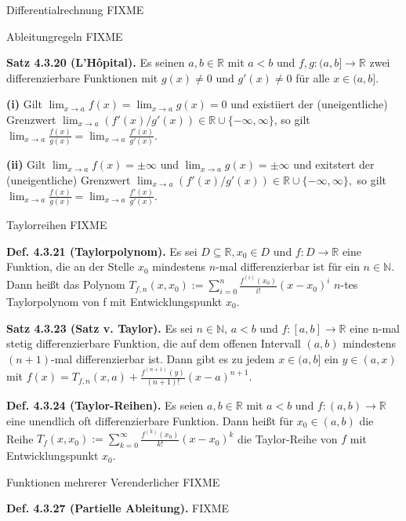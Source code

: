 Differentialrechnung FIXME



Ableitungregeln FIXME



\textbf{Satz 4.3.20 (L'Hôpital).} Es seinen $a,b\in\mathbb{R}$ mit
$a<b$ und $f,g:(a,b]\rightarrow\mathbb{R}$ zwei differenzierbare
Funktionen mit $g(x)\not=0$ und $g'(x)\not=0$ für alle $x\in(a,b]$.

\textbf{(i)} Gilt $\lim_{x\rightarrow a}f(x)=\lim_{x\rightarrow a}g(x)=0$
und existiiert der (uneigentliche) Grenzwert $\lim_{x\rightarrow a}(f'(x)/g'(x))\in\mathbb{R}\cup\{-\infty,\infty\}$,
so gilt $\lim_{x\rightarrow a}\frac{f(x)}{g(x)}=\lim_{x\rightarrow a}\frac{f'(x)}{g'(x)}$.

\textbf{(ii) }Gilt $\lim_{x\rightarrow a}f(x)=\pm\infty$ und $\lim_{x\rightarrow a}g(x)=\pm\infty$
und exitstert der (uneigentliche) Grenzwert $\lim_{x\rightarrow a}(f'(x)/g'(x))\in\mathbb{R}\cup\{-\infty,\infty\},$
so gilt $\lim_{x\rightarrow a}\frac{f(x)}{g(x)}=\lim_{x\rightarrow a}\frac{f'(x)}{g'(x)}$.

Taylorreihen FIXME

\textbf{Def. 4.3.21 (Taylorpolynom).} Es sei $D\subseteq\mathbb{R},x_{0}\in D$
und $f:D\rightarrow\mathbb{R}$ eine Funktion, die an der Stelle $x_{0}$
mindestens $n$-mal differenzierbar ist für ein $n\in\mathbb{N}.$
Dann heißt das Polynom $T_{f,n}(x,x_{0}):=\sum_{i=0}^{n}\frac{f^{(i)}(x_{0})}{i!}(x-x_{0})^{i}$
$n$-tes Taylorpolynom von f mit Entwicklungspunkt $x_{0}$.

\textbf{Satz 4.3.23 (Satz v. Taylor).} Es sei $n\in\mathbb{N}$, $a<b$
und $f:[a,b]\rightarrow\mathbb{R}$ eine n-mal stetig differenzierbare
Funktion, die auf dem offenen Intervall $(a,b)$ mindestens $(n+1)$-mal
differenzierbar ist. Dann gibt es zu jedem $x\in(a,b]$ ein $y\in(a,x)$
mit $f(x)=T_{f,n}(x,a)+\frac{f^{(n+1)}(y)}{(n+1)!}(x-a)^{n+1}$.

\textbf{Def. 4.3.24 (Taylor-Reihen).} Es seien $a,b\in\mathbb{R}$
mit $a<b$ und $f:(a,b)\rightarrow\mathbb{R}$ eine unendlich oft
differenzierbare Funktion. Dann heißt für $x_{0}\in(a,b)$ die Reihe
$T_{f}(x,x_{0}):=\sum_{k=0}^{\infty}\frac{f^{(k)}(x_{0})}{k!}(x-x_{0})^{k}$
die Taylor-Reihe von $f$ mit Entwicklungspunkt $x_{0}$.

Funktionen mehrerer Verenderlicher FIXME

\textbf{Def. 4.3.27 (Partielle Ableitung).} FIXME

